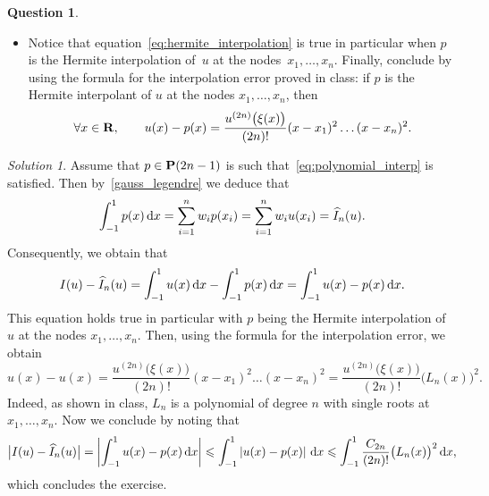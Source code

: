\documentclass[11pt]{article}
\theoremstyle{definition}
\newtheorem{question}{Question}
\theoremstyle{remark}
\newtheorem*{protosolution}{Solution}
\newenvironment{solutionframe}
{%
    \begin{mdframed}[
        leftmargin=1cm,
        skipabove=.3cm,
        linecolor=blue,
        backgroundcolor=lightgreen,
        linewidth=0pt,
        innerleftmargin=.5em,
        innerrightmargin=.5em,
        innertopmargin=.3em,
        innerbottommargin=.6em,
    ]
}
{
    \end{mdframed}
}
\newenvironment{solution}
{\pushQED{\qed}\renewcommand{\qedsymbol}{$\triangle$}
\begin{solutionframe}\small \begin{protosolution}}
{\popQED\end{protosolution}\end{solutionframe}}
\begin{document}
\begin{question}
\begin{enumerate}
\begin{itemize}
                        \item
                            Notice that equation~\eqref{eq:hermite_interpolation} is true in particular when $p$ is the Hermite interpolation of~$u$ at the nodes~$x_1, \dotsc, x_n$.
                            Finally, conclude by using the formula for the interpolation error proved in class:
                            if $p$ is the Hermite interpolant of $u$ at the nodes $x_1, \dotsc, x_n$,
                        then
                        \[
                            \forall x \in \mathbf R, \qquad
                            u(x) - p(x) = \frac{u^{(2n)}\bigl(\xi(x)\bigr)}{(2n)!} (x-x_1)^2 \dotsc (x - x_n)^2.
                        \]
                    \end{itemize}
                    \begin{solution}
                        Assume that $p \in \mathbf P(2n-1)$ is such that~\eqref{eq:polynomial_interp} is satisfied.
                        Then by~\eqref{gauss_legendre} we deduce that
                        \[
                            \int_{-1}^{1} p(x) \, \mathrm d x = \sum_{i=1}^{n} w_i p(x_i) = \sum_{i=1}^{n} w_i u(x_i) = \widehat I_n(u).
                        \]
                        Consequently,
                        we obtain that
                        \[
                            I(u) - \widehat I_n(u) = \int_{-1}^1 u(x)  \, \mathrm d x - \int_{-1}^1 p(x) \, \mathrm d x = \int_{-1}^1 u(x) - p(x) \, \mathrm d x.
                        \]
                        This equation holds true in particular with $p$ being the Hermite interpolation of~$u$ at the nodes $x_1, \dotsc, x_n$.
                        Then, using the formula for the interpolation error,
                        we obtain
                        \[
                            u(x) - u(x) = \frac{u^{(2n)}\bigl(\xi(x)\bigr)}{(2n)!} (x-x_1)^2 \dotsc (x - x_n)^2
                            = \frac{u^{(2n)}\bigl(\xi(x)\bigr)}{(2n)!} \bigl(L_n(x)\bigr)^2.
                        \]
                        Indeed, as shown in class, $L_n$ is a polynomial of degree $n$ with single roots at $x_1, \dotsc, x_n$.
                        Now we conclude by noting that
                        \[
                            \bigl\lvert I(u) - \widehat I_n(u) \bigr\rvert
                            = \left\lvert \int_{-1}^{1} u(x) - p(x) \, \mathrm d x \right\rvert
                            \leqslant \int_{-1}^{1} \left\lvert u(x) - p(x) \right\rvert \, \mathrm d x
                            \leqslant \int_{-1}^{1} \frac{C_{2n}}{(2n)!} \bigl(L_n(x)\bigr)^2 \, \mathrm d x,
                        \]
                        which concludes the exercise.
                    \end{solution}
    \end{enumerate}
\end{question}
\end{document}
